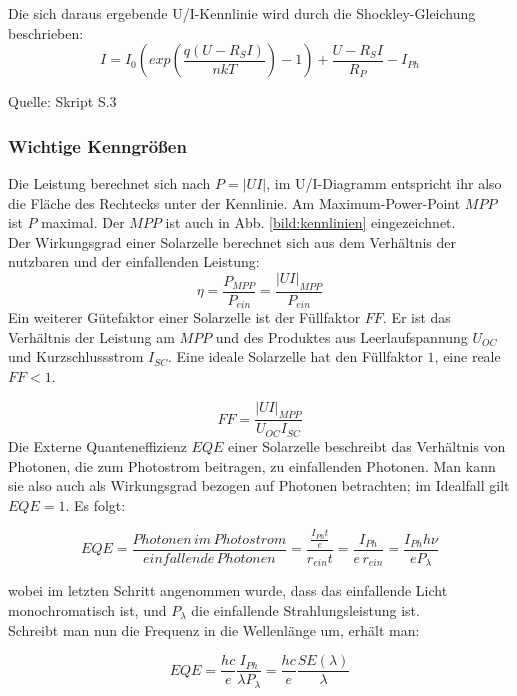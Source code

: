Die sich daraus ergebende U/I-Kennlinie wird durch die Shockley-Gleichung beschrieben:
\begin{equation}
    I = I_0 (exp(\frac{q(U-R_SI)}{nkT})-1) + \frac{U-R_SI}{R_P} - I_{Ph}
\end{equation}

Quelle: Skript S.3

\subsubsection{Wichtige Kenngrößen}
Die Leistung berechnet sich nach $P = |UI|$, im U/I-Diagramm entspricht ihr also die Fläche des Rechtecks unter der Kennlinie. Am Maximum-Power-Point $MPP$ ist $P$ maximal. Der $MPP$ ist auch in Abb. \ref{bild:kennlinien} eingezeichnet. \\
Der Wirkungsgrad einer Solarzelle berechnet sich aus dem Verhältnis der nutzbaren und der einfallenden Leistung:
\begin{equation*}
\eta = \frac{P_{MPP}}{P_{ein}} = \frac{|UI|_{MPP}}{P_{ein}}
\end{equation*}
Ein weiterer Gütefaktor einer Solarzelle ist der Füllfaktor $FF$. Er ist das Verhältnis der Leistung am $MPP$ und des Produktes aus Leerlaufspannung $U_{OC}$ und Kurzschlussstrom $I_{SC}$. Eine ideale Solarzelle hat den Füllfaktor $1$, eine reale $FF < 1$.

\begin{equation*}
FF = \frac{|UI|_{MPP}}{U_{OC} I_{SC}}
\end{equation*}
Die Externe Quanteneffizienz $EQE$ einer Solarzelle beschreibt das Verhältnis von Photonen, die zum Photostrom beitragen, zu einfallenden Photonen. Man kann sie also auch als Wirkungsgrad bezogen auf Photonen betrachten; im Idealfall gilt $EQE = 1$. Es folgt:

\begin{equation}
EQE = \frac{Photonen \, im \, Photostrom}{einfallende \, Photonen} = \frac{ \frac{I_{Ph}t}{e}}{r_{ein}t} = \frac{I_{Ph}}{e \, r_{ein}} = \frac{I_{Ph} h \nu}{e P_\lambda}
\end{equation}

wobei im letzten Schritt angenommen wurde, dass das einfallende Licht monochromatisch ist, und $P_\lambda$ die einfallende Strahlungsleistung ist. \\
Schreibt man nun die Frequenz in die Wellenlänge um, erhält man:

\begin{equation}
EQE = \frac{h c}{e} \frac{I_{Ph}}{\lambda P_\lambda} = \frac{h c}{e} \frac{SE(\lambda)}{\lambda}
\end{equation}

